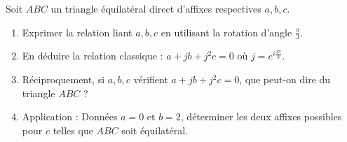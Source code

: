 \documentclass[11pt]{article}
\begin{document}
\begin{exercice}
Soit $ABC$ un triangle équilatéral direct d'affixes respectives $a, b, c$.
\begin{enumerate}
    \item Exprimer la relation liant $a, b, c$ en utilisant la rotation d'angle $\frac{\pi}{3}$.
    \item En déduire la relation classique : $a + jb + j^2c = 0$ où $j = e^{i\frac{2\pi}{3}}$.
    \item Réciproquement, si $a, b, c$ vérifient $a + jb + j^2c = 0$, que peut-on dire du triangle $ABC$ ?
    \item Application : Données $a = 0$ et $b = 2$, déterminer les deux affixes possibles pour $c$ telles que $ABC$ soit équilatéral.
\end{enumerate}
\end{exercice}
\end{document}
